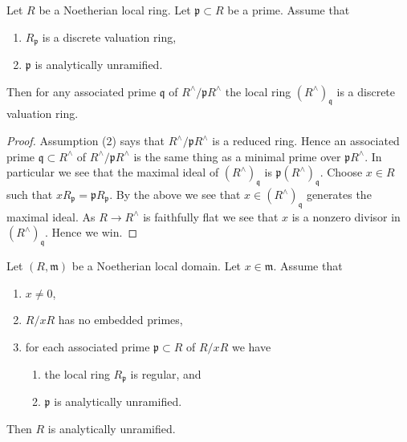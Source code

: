 \begin{lemma}
\label{lemma-codimension-1-analytically-unramified}
Let $R$ be a Noetherian local ring.
Let $\mathfrak p \subset R$ be a prime.
Assume that
\begin{enumerate}
\item $R_{\mathfrak p}$ is a discrete valuation ring,
\item $\mathfrak p$ is analytically unramified.
\end{enumerate}
Then for any associated prime $\mathfrak q$ of $R^\wedge/\mathfrak pR^\wedge$
the local ring $(R^\wedge)_{\mathfrak q}$ is a discrete valuation ring.
\end{lemma}

\begin{proof}
Assumption (2) says that $R^\wedge/\mathfrak pR^\wedge$ is a reduced ring.
Hence an associated prime $\mathfrak q \subset R^\wedge$
of $R^\wedge/\mathfrak pR^\wedge$
is the same thing as a minimal prime over $\mathfrak pR^\wedge$.
In particular we see that the maximal ideal of $(R^\wedge)_{\mathfrak q}$
is $\mathfrak p(R^\wedge)_{\mathfrak q}$.
Choose $x \in R$ such that $xR_{\mathfrak p} = \mathfrak pR_{\mathfrak p}$.
By the above we see that $x \in (R^\wedge)_{\mathfrak q}$ generates
the maximal ideal. As $R \to R^\wedge$ is faithfully flat we see that
$x$ is a nonzero divisor in $(R^\wedge)_{\mathfrak q}$.
Hence we win.
\end{proof}

\begin{lemma}
\label{lemma-criterion-analytically-unramified}
Let $(R, \mathfrak m)$ be a Noetherian local domain.
Let $x \in \mathfrak m$. Assume that
\begin{enumerate}
\item $x \not = 0$,
\item $R/xR$ has no embedded primes,
\item for each associated prime $\mathfrak p \subset R$
of $R/xR$ we have
\begin{enumerate}
\item the local ring $R_{\mathfrak p}$ is regular, and
\item $\mathfrak p$ is analytically unramified.
\end{enumerate}
\end{enumerate}
Then $R$ is analytically unramified.
\end{lemma}

